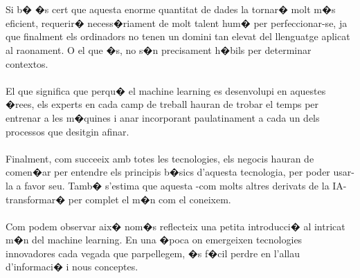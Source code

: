 \documentclass[12pt,a4paper,openright,oneside]{article}
\numberwithin{equation}{section}
\theoremstyle{definition}
\begin{document}
\\\\
Si b� �s cert que aquesta enorme quantitat de dades la tornar� molt m�s eficient, requerir� necess�riament de molt talent hum� per perfeccionar-se, ja que finalment els ordinadors no tenen un domini tan elevat del llenguatge aplicat al raonament. O el que �s, no s�n precisament h�bils per determinar contextos.
\\\\
El que significa que perqu� el machine learning es desenvolupi en aquestes �rees, els experts en cada camp de treball hauran de trobar el temps per entrenar a les m�quines i anar incorporant paulatinament a cada un dels processos que desitgin afinar.
\\\\
Finalment, com succeeix amb totes les tecnologies, els negocis hauran de comen�ar per entendre els principis b�sics d'aquesta tecnologia, per poder usar-la a favor seu. Tamb� s'estima que aquesta -com molts altres derivats de la IA- transformar� per complet el m�n com el coneixem.
\\\\
Com podem observar aix� nom�s reflecteix una petita introducci� al intricat m�n del machine learning. En una �poca on emergeixen tecnologies innovadores cada vegada que parpellegem, �s f�cil perdre en l'allau d'informaci� i nous conceptes.
\newpage
\end{document}
